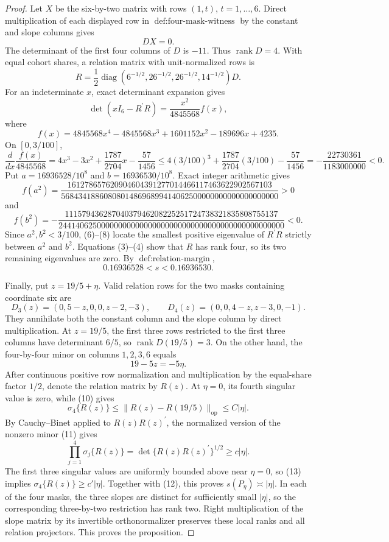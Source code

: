 \documentclass{article}
\begin{document}
\begin{proof}
Let \(X\) be the six-by-two matrix with rows \((1,t)\), \(t=1,\ldots,6\). Direct multiplication of each displayed row in \(\operatorname{def:four\text{-}mask\text{-}witness}\) by the constant and slope columns gives
\[
DX=0.
\tag{3}
\]
The determinant of the first four columns of \(D\) is \(-11\). Thus \(\operatorname{rank}D=4\). With equal cohort shares, a relation matrix with unit-normalized rows is
\[
R=\frac12\operatorname{diag}(6^{-1/2},26^{-1/2},26^{-1/2},14^{-1/2})D.
\tag{4}
\]
For an indeterminate \(x\), exact determinant expansion gives
\[
\det(xI_6-R^{\prime}R)=\frac{x^2}{4845568}f(x),
\]
where
\[
f(x)=4845568x^4-4845568x^3+1601152x^2-189696x+4235.
\tag{5}
\]
On \([0,3/100]\),
\[
\frac{d}{dx}\frac{f(x)}{4845568}
=4x^3-3x^2+\frac{1787}{2704}x-\frac{57}{1456}
\leq4(3/100)^3+\frac{1787}{2704}(3/100)-\frac{57}{1456}
=-\frac{22730361}{1183000000}<0.
\tag{6}
\]
Put \(a=16936528/10^8\) and \(b=16936530/10^8\). Exact integer arithmetic gives
\[
f(a^2)=
\frac{161278657620904604391277014466117463622902567103}
{568434188608080148696899414062500000000000000000000}>0
\tag{7}
\]
and
\[
f(b^2)=
-\frac{11157943628704037946208225251724738321835808755137}
{24414062500000000000000000000000000000000000000000000}<0.
\tag{8}
\]
Since \(a^2,b^2<3/100\), (6)--(8) locate the smallest positive eigenvalue of \(R^{\prime}R\) strictly between \(a^2\) and \(b^2\). Equations (3)--(4) show that \(R\) has rank four, so its two remaining eigenvalues are zero. By \(\operatorname{def:relation\text{-}margin}\),
\[
0.16936528<s<0.16936530.
\tag{9}
\]

Finally, put \(z=19/5+\eta\). Valid relation rows for the two masks containing coordinate six are
\[
D_3(z)=(0,5-z,0,0,z-2,-3),
\qquad
D_4(z)=(0,0,4-z,z-3,0,-1).
\tag{10}
\]
They annihilate both the constant column and the slope column by direct multiplication. At \(z=19/5\), the first three rows restricted to the first three columns have determinant \(6/5\), so \(\operatorname{rank}D(19/5)=3\). On the other hand, the four-by-four minor on columns \(1,2,3,6\) equals
\[
19-5z=-5\eta.
\tag{11}
\]
After continuous positive row normalization and multiplication by the equal-share factor \(1/2\), denote the relation matrix by \(R(z)\). At \(\eta=0\), its fourth singular value is zero, while (10) gives
\[
\sigma_4\{R(z)\}
\leq\|R(z)-R(19/5)\|_{\mathrm{op}}
\leq C|\eta|.
\tag{12}
\]
By Cauchy--Binet applied to \(R(z)R(z)^{\prime}\), the normalized version of the nonzero minor (11) gives
\[
\prod_{j=1}^4\sigma_j\{R(z)\}
=\det\{R(z)R(z)^{\prime}\}^{1/2}
\geq c|\eta|.
\tag{13}
\]
The first three singular values are uniformly bounded above near \(\eta=0\), so (13) implies \(\sigma_4\{R(z)\}\geq c'|\eta|\). Together with (12), this proves \(s(P_\eta)\asymp|\eta|\). In each of the four masks, the three slopes are distinct for sufficiently small \(|\eta|\), so the corresponding three-by-two restriction has rank two. Right multiplication of the slope matrix by its invertible orthonormalizer preserves these local ranks and all relation projectors. This proves the proposition.
\end{proof}
\end{document}
